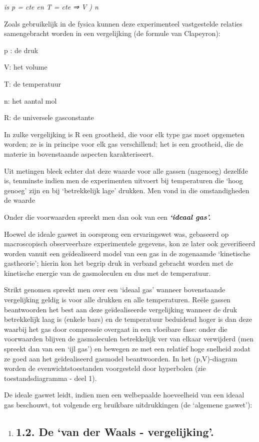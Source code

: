 \documentclass[]{article}
\begin{document}
\emph{is p = cte en T = cte ⇒ V ) n}

Zoals gebruikelijk in de fysica kunnen deze experimenteel vastgestelde
relaties samengebracht worden in een vergelijking (de formule van
Clapeyron):

p : de druk

V: het volume

T: de temperatuur

n: het aantal mol

R: de universele gasconstante

In zulke vergelijking is R een grootheid, die voor elk type gas moet
opgemeten worden; ze is in principe voor elk gas verschillend; het is
een grootheid, die de materie in bovenstaande aspecten karakteriseert.

Uit metingen bleek echter dat deze waarde voor alle gassen (nagenoeg)
dezelfde is, tenminste indien men de experimenten uitvoert bij
temperaturen die `hoog genoeg' zijn en bij `betrekkelijk lage' drukken.
Men vond in die omstandigheden de waarde

Onder die voorwaarden spreekt men dan ook van een \emph{\textbf{`ideaal
gas'.}}

Hoewel de ideale gaswet in oorsprong een ervaringswet was, gebaseerd op
macroscopisch observeerbare experimentele gegevens, kon ze later ook
geverifieerd worden vanuit een geïdealiseerd model van een gas in de
zogenaamde `kinetische gastheorie'; hierin kon het begrip druk in
verband gebracht worden met de kinetische energie van de gasmoleculen en
dus met de temperatuur.

Strikt genomen spreekt men over een `ideaal gas' wanneer bovenstaande
vergelijking geldig is voor alle drukken en alle temperaturen. Reële
gassen beantwoorden het best aan deze geïdealiseerde vergelijking
wanneer de druk betrekkelijk laag is (enkele bars) en de temperatuur
beduidend hoger is dan deze waarbij het gas door compressie overgaat in
een vloeibare fase: onder die voorwaarden blijven de gasmoleculen
betrekkelijk ver van elkaar verwijderd (men spreekt dan van een `ijl
gas') en bewegen ze met een relatief hoge snelheid zodat ze goed aan het
geïdealiseerd gasmodel beantwoorden. In het (p,V)-diagram worden de
evenwichtstoestanden voorgesteld door hyperbolen (zie toestandsdiagramma
- deel 1).

De ideale gaswet leidt, indien men een welbepaalde hoeveelheid van een
ideaal gas beschouwt, tot volgende erg bruikbare uitdrukkingen (de
`algemene gaswet'):

\begin{enumerate}
\item
  \subsection{1.2. De `van der Waals -
  vergelijking'.}\label{de-van-der-waals---vergelijking.}
\end{enumerate}
\end{document}
